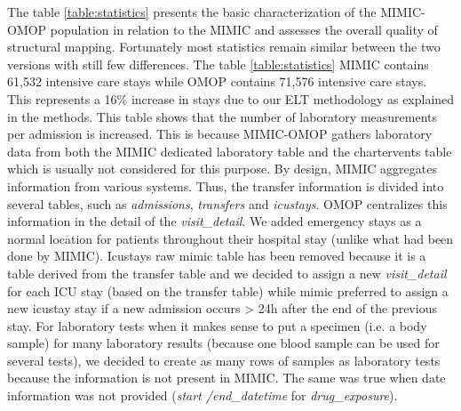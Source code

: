 The table \ref{table:statistics} presents the basic characterization of the 
MIMIC-OMOP population in relation to the MIMIC and assesses the overall quality of 
structural mapping.
Fortunately most statistics remain similar between the two versions with still
few differences. The table \ref{table:statistics} MIMIC contains 61,532
intensive care stays while OMOP contains 71,576 intensive care stays. This
represents a 16\% increase in stays due to our ELT methodology as explained in
the methods. This table shows that the number of laboratory measurements per
admission is increased. This is because MIMIC-OMOP gathers laboratory data from
both the MIMIC dedicated laboratory table and the chartervents table which is
usually not considered for this purpose.
% 
By design, MIMIC aggregates information from various systems\cite{mimic-omop}.
Thus, the transfer information is divided into several tables, such as
\textit{admissions}, \textit{transfers} and \textit{icustays}. OMOP centralizes
this information in the detail of the \textit{visit\_detail}. 
We added emergency stays as a normal location for patients throughout their 
hospital stay (unlike what had been done by MIMIC). Icustays raw mimic table has 
been removed because it is a table derived from the transfer table \cite{icustays-doc} 
and we decided to assign a new \textit{visit\_detail} for each ICU stay (based on 
the transfer table) while mimic preferred to assign a new icustay stay if a new 
admission occurs > 24h after the end of the previous stay.
For laboratory tests when it makes sense to put a specimen (i.e. a body sample)
for many laboratory results (because one blood sample can be used for several
tests), we decided to create as many rows of samples as laboratory tests
because the information is not present in MIMIC. The same was true when date
information was not provided (\textit{start /end\_datetime} for
\textit{drug\_exposure}).

